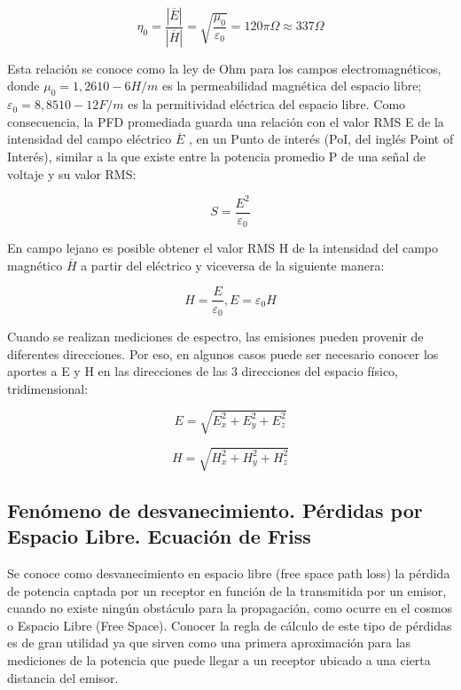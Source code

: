 \begin{equation} \label{equ_cuarenta_tres}
	 \eta_{0} = \dfrac{|\overline{E} |}{|\overline{H}|} = \sqrt{\dfrac{\mu_{0}}{\varepsilon_{0}}}= 120\pi \Omega \approx 337\Omega 
\end{equation}

Esta relación se conoce como la ley de Ohm para los campos electromagnéticos, donde $\mu_{0}=1,26 10-6H/m$ es la permeabilidad magnética del espacio libre; $\varepsilon_{0}=8,85 10-12F/m$ es la permitividad eléctrica del espacio libre. Como consecuencia, la PFD promediada guarda una relación con el valor RMS E de la intensidad del campo eléctrico $\overline{E}$ , en un Punto de interés  (PoI, del inglés Point of Interés), similar a la que existe entre la potencia promedio P de una señal de voltaje y su valor RMS: 

\begin{equation} \label{equ_cuarenta_cuatro}
	  S= \dfrac{E^{2}}{\varepsilon_{0}}
\end{equation}

En campo lejano es posible obtener el valor RMS H de la intensidad del campo magnético $\overline{H}$ a partir del eléctrico y viceversa de la siguiente manera:

\begin{equation} \label{equ_cuarenta_cinco}
	  H= \dfrac{E}{\varepsilon_{0}}, E=\varepsilon_{0}H
\end{equation}

Cuando se realizan mediciones de espectro, las emisiones pueden provenir de diferentes direcciones. Por eso, en algunos casos puede ser necesario conocer los aportes a E y H en las direcciones de las 3 direcciones del espacio físico, tridimensional:

\begin{equation} \label{equ_cuarenta_seis}
E = \sqrt{E_{x}^{2}+E_{y}^{2}+E_{z}^{2}} 
\end{equation}

\begin{equation} \label{equ_cuarenta_siete}
 H = \sqrt{H_{x}^{2}+H_{y}^{2}+H_{z}^{2}} 
\end{equation}

\subsection{Fenómeno de desvanecimiento. Pérdidas por Espacio Libre. Ecuación de Friss}

Se conoce como desvanecimiento en espacio libre (free space path loss) la pérdida de potencia captada por un receptor en función de la transmitida por un emisor, cuando no existe ningún obstáculo para la propagación, como ocurre en el cosmos o Espacio Libre (Free Space). Conocer la regla de cálculo de este tipo de pérdidas es de gran utilidad ya que sirven como una primera aproximación para las mediciones de la potencia que puede llegar a un receptor ubicado a una cierta distancia del emisor. \\



